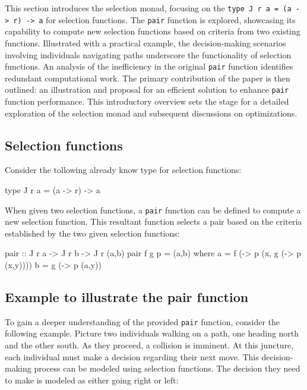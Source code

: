 \documentclass[runningheads]{llncs}
\begin{document}
This section introduces the selection monad, focusing on the
\texttt{type\ J\ r\ a\ =\ (a\ -\textgreater{}\ r)\ -\textgreater{}\ a}
for selection functions. The \texttt{pair} function is explored,
showcasing its capability to compute new selection functions based on
criteria from two existing functions. Illustrated with a practical
example, the decision-making scenarios involving individuals navigating
paths underscore the functionality of selection functions. An analysis
of the inefficiency in the original \texttt{pair} function identifies
redundant computational work. The primary contribution of the paper is
then outlined: an illustration and proposal for an efficient solution to
enhance \texttt{pair} function performance. This introductory overview
sets the stage for a detailed exploration of the selection monad and
subsequent discussions on optimizations.

\subsection{Selection functions}\label{selection-functions}

Consider the tollowing already know type for selection functions:

\begin{code}
type J r a = (a -> r) -> a
\end{code}

When given two selection functions, a \texttt{pair} function can be
defined to compute a new selection function. This resultant function
selects a pair based on the criteria established by the two given
selection functions:

\begin{code}
pair :: J r a -> J r b -> J r (a,b)
pair f g p = (a,b)
  where
      a = f (\x -> p (x, g (\y -> p (x,y))))
      b = g (\y -> p (a,y))
\end{code}

\subsection{Example to illustrate the pair
function}\label{example-to-illustrate-the-pair-function}

To gain a deeper understanding of the provided \texttt{pair} function,
consider the following example. Picture two individuals walking on a
path, one heading north and the other south. As they proceed, a
collision is imminent. At this juncture, each individual must make a
decision regarding their next move. This decision-making process can be
modeled using selection functions. The decision they need to make is
modeled as either going right or left:
\end{document}
